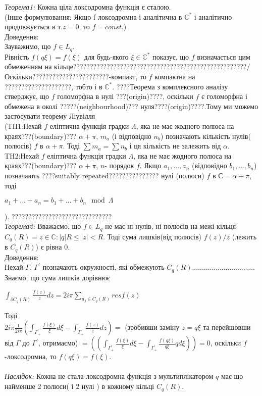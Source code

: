 \documentclass[12pt,a4paper]{article}
\begin{document}
\emph{Теорема1:} Кожна ціла локсодромна функція є сталою.\\
(Інше формулювання: Якщо f локсодромна і аналітична в $\mathbb{C}^{*}$ і аналітично продовжується в т.$z=0$, то $f=const$.)\\
Доведення:\\
Зауважимо, що $f\in L_{q}$.\\
Рівність $f(q\xi)=f(\xi)$ для будь-якого $\xi \in \mathbb{C}^{*}$ показує, що $f$ визначається цим обмеженням на кільце????????????????????????????????????????????????????/ Оскільки???????????????????????-компакт, то $f$ компактна на ????????????????????, тобто і в $\mathbb{C}^{*}$. ????Теорема з комплексного аналізу стверджує, що $f$ голоморфна в нулі ???(origin)????, оскільки $f$ є голоморфна і обмежена в околі ?????(neighbourhood)??? нуля????(origin)????.Тому ми можемо застосувати теорему Ліувілля \\
(TH1:Нехай $f$ еліптична функція градки $\Lambda$, яка не має жодного полюса на краях???(boundary)??? $\alpha+\pi$, $m_{a}$ (і відповідно $n_{b}$) позначають кількість нулів( полюсів) $f$ в $\alpha+\pi$. Тоді $\sum m_{a}=\sum n_{b}$ і ця кількість не залежить від $\alpha$.\\

TH2:Нехай $f$ еліптична функція градки $\Lambda$, яка не має жодного полюса на краях???(boundary)??? $\alpha+\pi$, $n$- порядок $f$. Якщо $a_{1},...,a_{n}$ (відповідно $b_{1},...,b_{n}$) позначають ????suitably repeated??????????????? нулі (полюси) $f$ в $С=\alpha+\pi$, тоді
\begin{center}
$a_{1}+...+a_{n}=b_{1}+...+b_{n}\mod\Lambda$
\end{center} ). ??????????????????????????????\\

\emph{Теорема2:} Вважаємо, що $f\in L_{q}$ не має ні нулів, ні полюсів на межі кільця $C_{q}(R)={z\in \mathbb{C}:\left |q  \right |R\leq \left |z  \right |<R }$. Тоді сума лишків(від полюсів) $f(z)/z$ (лежить в $C_{q}(R)$) є рівна $0$.\\
Доведення:\\
Нехай $\Gamma$, $\Gamma^{'}$ позначають окружності, які обмежують $C_{q}(R)$................................
Знаємо, що сума лишків дорівнює
\begin{center}
$\int_{\partial C_{q}(R)}^{ } \frac{f(z)}{z}dz=2i\pi \sum_{a_{j}\in C_{q}(R)}^{ } resf(z)$
\end{center}
Тоді \\
$2i\pi \frac{1}{2i\pi}(\int_{\Gamma^{'}_{+}}^{ } \frac{f(\xi )}{\xi }d\xi -\int_{\Gamma_{+}}^{ }\frac{f(z)}{z}dz)=$ (зробивши заміну $z=q\xi$  та перейшовши від $\Gamma$ до $\Gamma^{'}$, отримаємо)  $=((\int_{\Gamma^{'}_{+}}^{ } \frac{f(\xi )}{\xi }d\xi -\int_{\Gamma^{'}_{+}}^{ }\frac{f(q\xi)}{q\xi}qd\xi))=0$, оскільки $f$-локсодромна, то $f(q\xi)=f(\xi)$.\\
\\
\emph{Наслідок:} Кожна не стала локсодромна функція з мультиплікатором $q$ має що найменше 2 полюси( і 2 нулі ) в кожному кільці $C_{q}(R)$.\\
  
\end{document}
